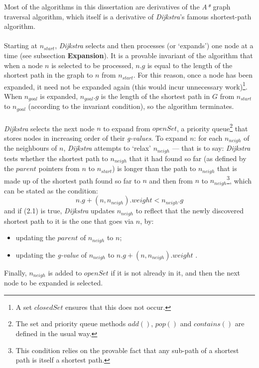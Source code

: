\documentclass[12pt,notitlepage]{report}
\begin{document}
Most of the algorithms in this dissertation are derivatives of the {\em A*} graph traversal algorithm, which itself is a derivative of {\em Dijkstra}'s famous shortest-path algorithm.\\

\\
\noindent
Starting at $n_{start}$, {\em Dijkstra} selects and then processes (or `expands') one node at a time (see subsection {\bfseries Expansion}). It is a provable\cite{CormenDijkstra} invariant of the algorithm that when a node $n$ is selected to be processed, $n.g$ is equal to the length of the shortest path in the graph to $n$ from $n_{start}$. For this reason, once a node has been expanded, it need not be expanded again (this would incur unnecessary work)\footnote{A set $closedSet$ ensures that this does not occur.}. When $n_{goal}$ is expanded, $n_{goal}.g$ is the length of the shortest path in $G$ from $n_{start}$ to $n_{goal}$ (according to the invariant condition), so the algorithm terminates.\\

\\
\noindent
{\em Dijkstra} selects the next node $n$ to expand from $openSet$, a priority queue\footnote{The set and priority queue methods $add()$, $pop()$ and  $contains()$ are defined in the usual way.} that stores nodes in increasing order of their {\em g-values}. To expand $n$: for each $n_{neigh}$ of the neighbours of $n$, {\em Dijkstra} attempts to `relax' $n_{neigh}$ --- that is to say: {\em Dijkstra} tests whether the shortest path to $n_{neigh}$ that it had found so far (as defined by the $parent$ pointers from $n$ to $n_{start}$) is longer than the path to $n_{neigh}$ that is made up of the shortest path found so far to $n$ and then from $n$ to $n_{neigh}$\footnote{This condition relies on the provable\cite{CormenDijkstra} fact that any sub-path of a shortest path is itself a shortest path.}, which can be stated as the condition:
\begin{equation}
n.g + (n,n_{neigh}).weight < n_{neigh}.g
\end{equation}
\noindent
and if (2.1) is true, {\em Dijkstra} updates $n_{neigh}$ to reflect that the newly discovered shortest path to it is the one that goes via $n$, by: 
\begin{itemize}
\item updating the $parent$ of $n_{neigh}$ to $n$;
\item updating the {\em g-value} of $n_{neigh}$ to $n.g + (n,n_{neigh}).weight$ .
\end{itemize}
Finally, $n_{neigh}$ is added to $openSet$ if it is not already in it, and then the next node to be expanded is selected.\\
\end{document}
